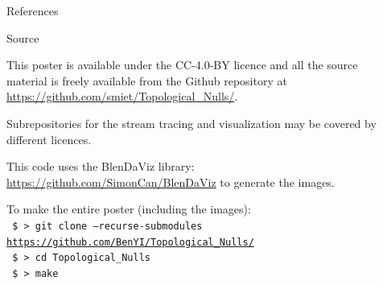 \documentclass[final]{beamer}
\newlength{\sepwid}
\newlength{\onecolwid}
\begin{document}
\begin{frame}[t]
\begin{columns}[t]
\begin{column}{\onecolwid}
\begin{block}{References}
\end{block}

\begin{block}{Source}
\begin{centering}
    \hfill
    \hfill
\end{centering}

	\vspace{1cm}
This poster is available under the  CC-4.0-BY  licence and all the source material is freely
available from the Github repository at \url{https://github.com/smiet/Topological_Nulls/}.

Subrepositories for the stream tracing and visualization may be covered by different licences. 

This code uses the BlenDaViz library: \url{https://github.com/SimonCan/BlenDaViz} to generate the images. 

    To make the entire poster (including the images):\\
\texttt{
	\$ > git clone --recurse-submodules  \url{https://github.com/BenYI/Topological_Nulls/}}\\
\texttt{
    \$ > cd Topological\_Nulls\\
  }
\texttt{
    \$ > make
  }


\end{block}

\end{column}

\begin{column}{\sepwid}\end{column} %


\end{columns} %

\end{frame} %
\end{document}
